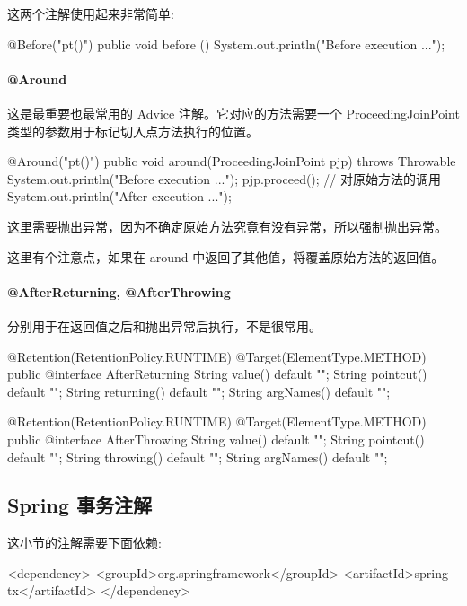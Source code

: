这两个注解使用起来非常简单:

\begin{Java}
@Before("pt()")
public void before () {
    System.out.println("Before execution ...");
}
\end{Java}

\paragraph*{@Around} 这是最重要也最常用的 Advice 注解。它对应的方法需要一个 ProceedingJoinPoint 类型的参数用于标记切入点方法执行的位置。

\begin{Java}
@Around("pt()")
public void around(ProceedingJoinPoint pjp) throws Throwable{
    System.out.println("Before execution ...");
    pjp.proceed();  // 对原始方法的调用
    System.out.println("After execution ...");
}
\end{Java}

这里需要抛出异常，因为不确定原始方法究竟有没有异常，所以强制抛出异常。

这里有个注意点，如果在 around 中返回了其他值，将覆盖原始方法的返回值。

\paragraph*{@AfterReturning, @AfterThrowing} 分别用于在返回值之后和抛出异常后执行，不是很常用。

\begin{Java}
@Retention(RetentionPolicy.RUNTIME)
@Target(ElementType.METHOD)
public @interface AfterReturning {
    String value() default "";
    String pointcut() default "";
    String returning() default "";
    String argNames() default "";
}

@Retention(RetentionPolicy.RUNTIME)
@Target(ElementType.METHOD)
public @interface AfterThrowing {
    String value() default "";
    String pointcut() default "";
    String throwing() default "";
    String argNames() default "";
}
\end{Java}

\subsection{Spring 事务注解}

这小节的注解需要下面依赖:

\begin{xml}
<dependency>
    <groupId>org.springframework</groupId>
    <artifactId>spring-tx</artifactId>
</dependency>
\end{xml}

